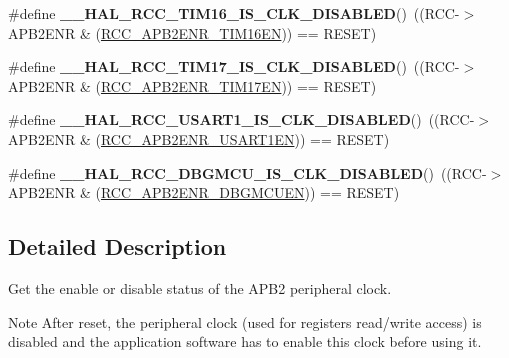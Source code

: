 \begin{DoxyCompactItemize}
\item 
\mbox{\label{group___r_c_c___a_p_b2___peripheral___clock___enable___disable___status_ga55adb9971771c35d36a549a1948b7b1e}} 
\#define {\bfseries \+\_\+\+\_\+\+H\+A\+L\+\_\+\+R\+C\+C\+\_\+\+T\+I\+M16\+\_\+\+I\+S\+\_\+\+C\+L\+K\+\_\+\+D\+I\+S\+A\+B\+L\+ED}()~((R\+CC-\/$>$A\+P\+B2\+E\+NR \& (\hyperlink{group___peripheral___registers___bits___definition_gaece1d96f631bcf146e5998314fd90910}{R\+C\+C\+\_\+\+A\+P\+B2\+E\+N\+R\+\_\+\+T\+I\+M16\+EN}))  == R\+E\+S\+ET)
\item 
\mbox{\label{group___r_c_c___a_p_b2___peripheral___clock___enable___disable___status_gaf55e3121b3ce93da44a1ac83f3cdac8a}} 
\#define {\bfseries \+\_\+\+\_\+\+H\+A\+L\+\_\+\+R\+C\+C\+\_\+\+T\+I\+M17\+\_\+\+I\+S\+\_\+\+C\+L\+K\+\_\+\+D\+I\+S\+A\+B\+L\+ED}()~((R\+CC-\/$>$A\+P\+B2\+E\+NR \& (\hyperlink{group___peripheral___registers___bits___definition_ga29e566fb62e24640c55693324801d87c}{R\+C\+C\+\_\+\+A\+P\+B2\+E\+N\+R\+\_\+\+T\+I\+M17\+EN}))  == R\+E\+S\+ET)
\item 
\mbox{\label{group___r_c_c___a_p_b2___peripheral___clock___enable___disable___status_ga22c9d59ac6062298a71eed0d6a4a9afd}} 
\#define {\bfseries \+\_\+\+\_\+\+H\+A\+L\+\_\+\+R\+C\+C\+\_\+\+U\+S\+A\+R\+T1\+\_\+\+I\+S\+\_\+\+C\+L\+K\+\_\+\+D\+I\+S\+A\+B\+L\+ED}()~((R\+CC-\/$>$A\+P\+B2\+E\+NR \& (\hyperlink{group___peripheral___registers___bits___definition_ga4666bb90842e8134b32e6a34a0f165f3}{R\+C\+C\+\_\+\+A\+P\+B2\+E\+N\+R\+\_\+\+U\+S\+A\+R\+T1\+EN})) == R\+E\+S\+ET)
\item 
\mbox{\label{group___r_c_c___a_p_b2___peripheral___clock___enable___disable___status_gaa14919a8c412f7cd388bbb44800ba5d7}} 
\#define {\bfseries \+\_\+\+\_\+\+H\+A\+L\+\_\+\+R\+C\+C\+\_\+\+D\+B\+G\+M\+C\+U\+\_\+\+I\+S\+\_\+\+C\+L\+K\+\_\+\+D\+I\+S\+A\+B\+L\+ED}()~((R\+CC-\/$>$A\+P\+B2\+E\+NR \& (\hyperlink{group___peripheral___registers___bits___definition_ga87db727052e2e14b12cb728ba978ebb8}{R\+C\+C\+\_\+\+A\+P\+B2\+E\+N\+R\+\_\+\+D\+B\+G\+M\+C\+U\+EN})) == R\+E\+S\+ET)
\end{DoxyCompactItemize}


\subsection{Detailed Description}
Get the enable or disable status of the A\+P\+B2 peripheral clock. 

\begin{DoxyNote}{Note}
After reset, the peripheral clock (used for registers read/write access) is disabled and the application software has to enable this clock before using it. 
\end{DoxyNote}
